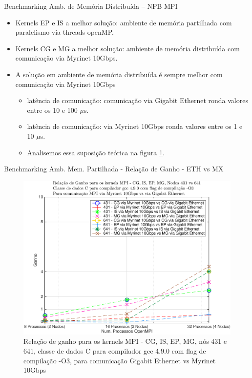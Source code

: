 \documentclass{beamer}
\begin{document}
   \begin{frame}{Benchmarking Amb. de Memória Distribuída  -- NPB MPI}
\begin{itemize}
\item \small Kernels EP e IS a melhor solução: ambiente de memória partilhada com paralelismo via threads openMP.
\item \small Kernels CG e MG a melhor solução: ambiente de memória distribuída com comunicação via Myrinet 10Gbps.
\item \small A solução em ambiente de memória distribuída é sempre melhor com comunicação via Myrinet 10Gbps
\begin{itemize}
\item \small latência de comunicação: comunicação via Gigabit Ethernet ronda valores entre os 10 e 100 $\mu$s.
\item \small latência de comunicação: via Myrinet 10Gbps ronda valores entre os 1 e 10 $\mu$s.
\item \small Analisemos essa suposição teórica na figura \ref{ganho_omp}.
\end{itemize}
\end{itemize}
\end{frame}
\begin{frame}{\small Benchmarking Amb. Mem. Partilhada  - {\small Relação de Ganho - ETH vs MX}}

\begin{figure}[H]
\centering
\includegraphics[width=0.75\columnwidth]{EPS/MPI/myri_vs_eth_431_vs_641.eps}
\caption{\tiny Relação de ganho para os kernels MPI - CG, IS, EP, MG, nós 431 e 641, classe de dados C para compilador gcc 4.9.0 com flag de compilação  -O3, para comunicação Gigabit Ethernet vs Myrinet 10Gbps}
\label{ganho_omp}
\end{figure}
\end{frame}
\end{document}
